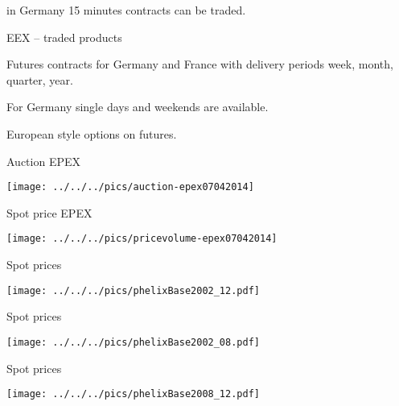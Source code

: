 	in Germany 15 minutes contracts can be traded.





{EEX -- traded products}






	Futures contracts for Germany and France with delivery periods week, month, quarter, year.


	For Germany single days and weekends are available.


	European style options on futures.





{Auction EPEX}
\begin{center}
\texttt{[image: ../../../pics/auction-epex07042014]}
\end{center}

{Spot price EPEX}
\begin{center}
\texttt{[image: ../../../pics/pricevolume-epex07042014]}
\end{center}

{Spot prices}
\begin{center}
\texttt{[image: ../../../pics/phelixBase2002\_12.pdf]}
\end{center}

{Spot prices}
\begin{center}
\texttt{[image: ../../../pics/phelixBase2002\_08.pdf]}
\end{center}

{Spot prices}
\begin{center}
\texttt{[image: ../../../pics/phelixBase2008\_12.pdf]}
\end{center}

